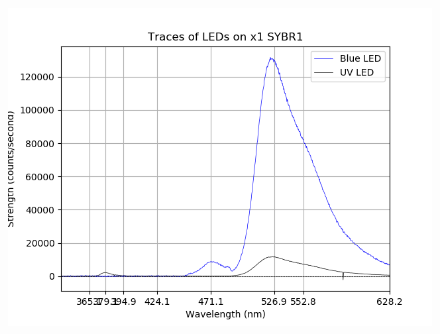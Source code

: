 \documentclass[8pt, a4paper]{article}
\begin{document}
\begin{figure}[h!]
\includegraphics{stain2.png}
\end{figure}
\end{document}

